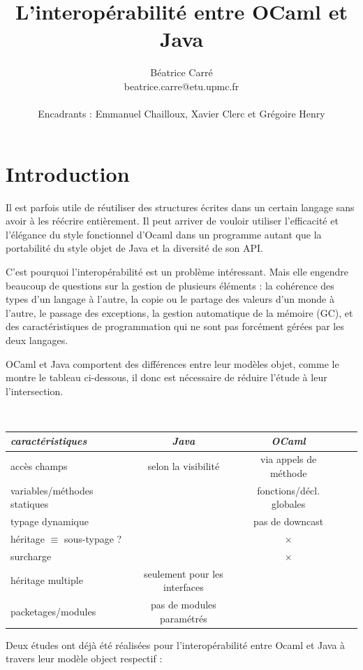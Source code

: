 \documentclass[a4paper, 11pt, notitlepage]{article}
\title{
  \huge L'interopérabilité entre OCaml et Java\\
}
\author{
  Béatrice Carré \\
  beatrice.carre@etu.upmc.fr \\
  \\
  Encadrants : Emmanuel Chailloux, Xavier Clerc et Grégoire Henry \\
}
\begin{document}
\maketitle
\tableofcontents
\newpage

\section*{Introduction}
Il est parfois utile de réutiliser des structures
écrites dans un certain langage sans avoir à les réécrire entièrement.
Il peut arriver de vouloir utiliser l'efficacité et
l'élégance du style fonctionnel d'Ocaml dans un
programme autant que la portabilité du style objet de Java et la
diversité de son API.

C'est pourquoi l'interopérabilité est un problème intéressant.
Mais elle engendre beaucoup de questions sur la gestion de
plusieurs éléments :
la cohérence des types d'un langage à l'autre,
la copie ou le partage des valeurs d'un monde à l'autre,
le passage des exceptions,
la gestion automatique de la mémoire (GC), 
et des caractéristiques de programmation qui ne sont pas forcément gérées par les
deux langages.

OCaml et Java comportent des différences entre leur modèles
objet, comme le montre le tableau ci-dessous, il donc est nécessaire
de réduire l'étude à leur l'intersection.

\ 
\newline
\noindent
\begin{tabular}{|l|c|c|c|c|}
  \hline
  \emph{caractéristiques} & \emph{Java} & \emph{OCaml} \\
  \hline
  accès champs & selon la visibilité & via appels de méthode\\\hline
  variables/méthodes statiques & \checkmark & fonctions/décl. globales\\\hline
  typage dynamique & \checkmark & pas de downcast \\\hline
  héritage $\equiv$ sous-typage ? &\checkmark  & $\times$ \\\hline
  surcharge & \checkmark & $\times$ \\\hline
  héritage multiple & seulement pour les interfaces & \checkmark\\
  \hline
  packetages/modules & pas de modules paramétrés & \checkmark\\\hline
\end{tabular}

Deux études ont déjà été réalisées pour l’interopérabilité entre
Ocaml et Java à travers leur modèle object respectif :
\end{document}
